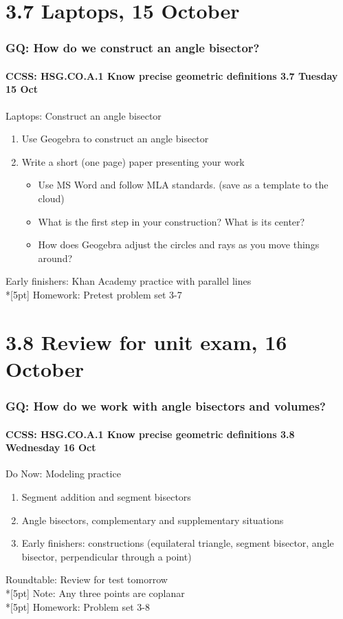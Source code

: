 \documentclass{beamer}
\begin{document}
\section{3.7 Laptops, 15 October}
  \frame
  {
    \frametitle{GQ: How do we construct an angle bisector?}
    \framesubtitle{CCSS: HSG.CO.A.1 Know precise geometric definitions \hfill \alert{3.7 Tuesday 15 Oct}}

    \begin{block}{Laptops: Construct an angle bisector}
    \begin{enumerate}
      \item Use Geogebra to construct an angle bisector
      \item Write a short (one page) paper presenting your work
      \begin{itemize}
        \item Use MS Word and follow MLA standards. (save as a template to the cloud)
        \item What is the first step in your construction? What is its center?
        \item How does Geogebra adjust the circles and rays as you move things around?
      \end{itemize}
    \end{enumerate}
    \end{block}
    Early finishers:  Khan Academy practice with parallel lines \\*[5pt]
    Homework: Pretest problem set 3-7
  }

\section{3.8 Review for unit exam, 16 October}
  \frame
  {
    \frametitle{GQ: How do we work with angle bisectors and volumes?}
    \framesubtitle{CCSS: HSG.CO.A.1 Know precise geometric definitions \hfill \alert{3.8 Wednesday 16 Oct}}

    \begin{block}{Do Now: Modeling practice}
    \begin{enumerate}
      \item Segment addition and segment bisectors
      \item Angle bisectors, complementary and supplementary situations
      \item Early finishers: constructions (equilateral triangle, segment bisector, angle bisector, perpendicular through a point)
    \end{enumerate}
    \end{block}
    Roundtable: Review for \alert{test tomorrow} \\*[5pt]
    Note: Any three points are coplanar  \\*[5pt]
    Homework: Problem set 3-8
  }
\end{document}
